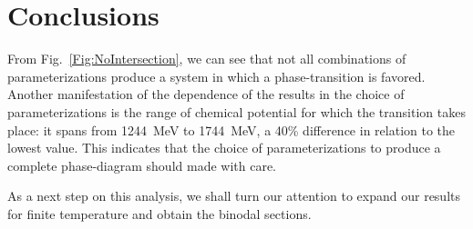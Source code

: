 \documentclass[prc, reprint, amsmath, floatfix,10pt]{revtex4-1}
\begin{document}

\section{Conclusions}

From Fig.~\ref{Fig:NoIntersection}, we can see that not all combinations of parameterizations produce a system in which a phase-transition is favored. Another manifestation of the dependence of the results in the choice of parameterizations is the range of chemical potential for which the transition takes place: it spans from 1244~MeV to 1744~MeV, a 40\% difference in relation to the lowest value. This indicates that the choice of parameterizations to produce a complete phase-diagram should made with care.

As a next step on this analysis, we shall turn our attention to expand our results for finite temperature and obtain the binodal sections.

%
%







\end{document}
